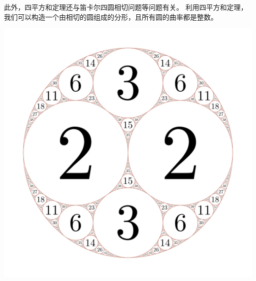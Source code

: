 \documentclass[main]{subfiles}
\begin{document}
此外，四平方和定理还与笛卡尔四圆相切问题等问题有关。
利用四平方和定理，我们可以构造一个由相切的圆组成的分形，且所有圆的曲率都是整数。

\centering
\includegraphics[width=0.3\linewidth]{dikaer.png}
\end{document}
